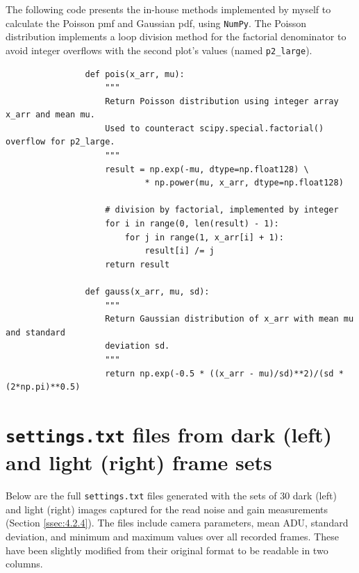 \documentclass[preprint2]{aastex702}
\begin{document}
			The following code presents the in-house methods implemented by myself to calculate the Poisson pmf and Gaussian pdf, using \texttt{NumPy}. The Poisson distribution implements a loop division method for the factorial denominator to avoid integer overflows with the second plot's values (named \texttt{p2\_large}).

			\begin{verbatim}
				def pois(x_arr, mu):
				    """
				    Return Poisson distribution using integer array x_arr and mean mu.
				    Used to counteract scipy.special.factorial() overflow for p2_large.
				    """
				    result = np.exp(-mu, dtype=np.float128) \
				            * np.power(mu, x_arr, dtype=np.float128)
				    
				    # division by factorial, implemented by integer 
				    for i in range(0, len(result) - 1):
				        for j in range(1, x_arr[i] + 1):
				            result[i] /= j
				    return result
			
				def gauss(x_arr, mu, sd):
				    """
				    Return Gaussian distribution of x_arr with mean mu and standard 
				    deviation sd.
				    """
				    return np.exp(-0.5 * ((x_arr - mu)/sd)**2)/(sd * (2*np.pi)**0.5)
			\end{verbatim}

		\section{\texttt{settings.txt} files from dark (left) and light (right) frame sets}\label{4.2.4-ld-set}

			Below are the full \texttt{settings.txt} files generated with the sets of 30 dark (left) and light (right) images captured for the read noise and gain measurements (Section \ref{ssec:4.2.4}). The files include camera parameters, mean ADU, standard deviation, and minimum and maximum values over all recorded frames. These have been slightly modified from their original format to be readable in two columns.\vspace{6pt}
\end{document}
